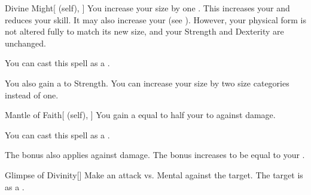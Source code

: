 \lowercase{\hypertarget{spell:Divine Might}{}}\label{spell:Divine Might}
\begin{attuneability}[Rank 4]{\hypertarget{spell:Divine Might}{Divine Might}}[ (self), ]
You increase your size by one .
This increases your  and reduces your  skill.
It may also increase your  (see ).
However, your physical form is not altered fully to match its new size, and your Strength and Dexterity are unchanged.

You can cast this spell as a .

\rankline
{} You also gain a   to Strength.
 You can increase your size by two size categories instead of one.
\end{attuneability}
\vspace{0.25em}



\lowercase{\hypertarget{spell:Mantle of Faith}{}}\label{spell:Mantle of Faith}
\begin{attuneability}[Rank 4]{\hypertarget{spell:Mantle of Faith}{Mantle of Faith}}[ (self), ]
You gain a  equal to half your  to  against  damage.

You can cast this spell as a .

\rankline
{} The bonus also applies against  damage.
 The bonus increases to be equal to your .
\end{attuneability}
\vspace{0.25em}



\lowercase{\hypertarget{spell:Glimpse of Divinity}{}}\label{spell:Glimpse of Divinity}
\begin{freeability}[Rank 5]{\hypertarget{spell:Glimpse of Divinity}{Glimpse of Divinity}}[]
Make an attack vs. Mental against the target.
\hit The target is  as a .
\end{freeability}
\vspace{0.25em}



